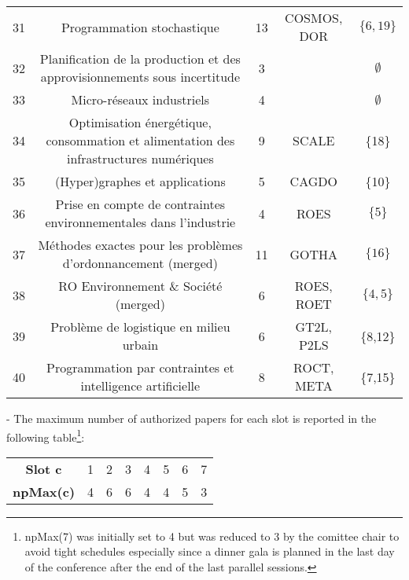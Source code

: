 \documentclass{article}
\begin{document}
\begin{center}
\begin{tabular}{ |c|c|c|c|c| }
 31 & Programmation stochastique
 & 13 & COSMOS, DOR & $\{6,19\}$  \\
 
 32 & Planification de la production et des approvisionnements sous incertitude & 3 & & $\emptyset$\\ 
 
 33 & Micro-réseaux industriels 
 & 4 & & $\emptyset$ \\ 
 
 34 &Optimisation énergétique, consommation et alimentation des infrastructures numériques
 & 9 & SCALE & \{18\}\\
 
 35 & (Hyper)graphes et applications
 & 5 & CAGDO & \{10\} \\

 36 & Prise en compte de contraintes environnementales dans l'industrie
 & 4 & ROES & $\{5\}$\\ 
 
 37 & Méthodes exactes pour les problèmes d'ordonnancement (merged) 
 & 11 & GOTHA & $\{16\}$ \\ 
 
 38 & RO Environnement \& Société (merged)
 & 6 & ROES, ROET & $\{4,5\}$\\
 
 39 & Problème de logistique en milieu urbain 
 
 & 6 & GT2L, P2LS & \{8,12\} \\

 40 &Programmation par contraintes et intelligence artificielle 
 & 8 & ROCT, META & \{7,15\} \\
 
 
 \hline
\end{tabular}
\end{center}

- The maximum number of authorized papers for each slot is reported in the following table\footnote{npMax(7) was initially set to 4 but was reduced to 3 by the comittee chair to avoid tight schedules especially since a dinner gala is planned in the last day of the conference after the end of the last parallel sessions. %
}:

\begin{center}
\begin{tabular}{ |c|ccccccc| } 
 \hline
 \textbf{Slot c} & 1 & 2 & 3 & 4 & 5 & 6 & 7 \\ 
 \textbf{npMax(c)} & 4 & 6 & 6 & 4 & 4 & 5 & 3  \\ 
 \hline
\end{tabular}
\end{center}
\end{document}
